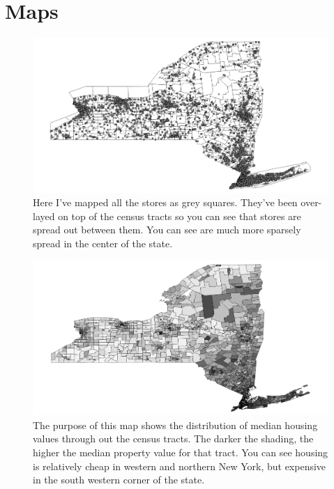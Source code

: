 \documentclass{report}
\begin{document}
\section{Maps}

\begin{figure}
\centering
\begin{framed}
\includegraphics[scale=.50]{map_3}
\caption{Here I've mapped all the stores as grey squares. They've been over-layed on top of the census tracts so you can see that stores are spread out between them. You can see are much more sparsely spread in the center of the state.}
\label{fig:map_3}
\end{framed}
\end{figure}

\begin{figure}
\centering
\begin{framed}
\includegraphics[scale=.50]{map_4}
\caption{The purpose of this map shows the distribution of median housing values through out the census tracts. The darker the shading, the higher the median property value for that tract. You can see housing is relatively cheap in western and northern New York, but expensive in the south western corner of the state.}
\label{fig:map_4}
\end{framed}
\end{figure}
\end{document}
